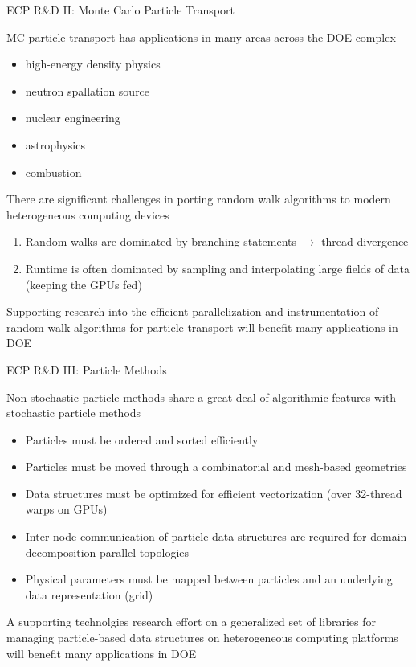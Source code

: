 \documentclass{beamer}
\begin{document}
\begin{frame}{ECP R\&D II: Monte Carlo Particle Transport}

  MC particle transport has applications in many areas across the DOE complex
  \begin{itemize}
    \setlength{\itemsep}{-0.2\baselineskip}
  \item high-energy density physics
  \item neutron spallation source
  \item nuclear engineering
  \item astrophysics
  \item combustion
  \end{itemize}

  \vfill

  There are significant challenges in porting random walk algorithms to modern
  heterogeneous computing devices
  \begin{enumerate}
  \item Random walks are dominated by branching statements $\rightarrow$
    thread divergence
  \item Runtime is often dominated by sampling and interpolating large fields
    of data (keeping the GPUs fed)
  \end{enumerate}

  \vfill

  Supporting research into the efficient parallelization and instrumentation
  of random walk algorithms for particle transport will benefit many
  applications in DOE

\end{frame}


\begin{frame}{ECP R\&D III: Particle Methods}

  Non-stochastic particle methods share a great deal of algorithmic features
  with stochastic particle methods
  \begin{itemize}
  \item Particles must be ordered and sorted efficiently
  \item Particles must be moved through a combinatorial and mesh-based
    geometries
  \item Data structures must be optimized for efficient vectorization (over
    32-thread warps on GPUs)
  \item Inter-node communication of particle data structures are required for
    domain decomposition parallel topologies
  \item Physical parameters must be mapped between particles and an underlying
    data representation (grid)
  \end{itemize}

  \vfill

  A supporting technolgies research effort on a generalized set of libraries
  for managing particle-based data structures on heterogeneous computing
  platforms will benefit many applications in DOE

\end{frame}
\end{document}
